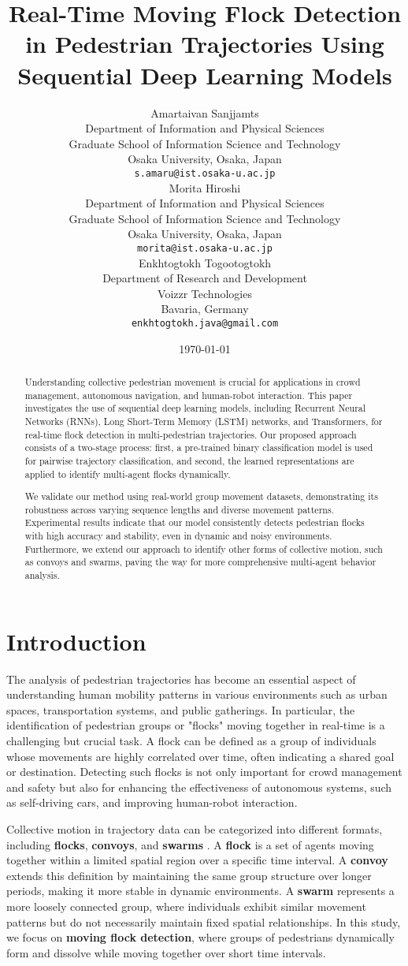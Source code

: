 \documentclass{article}
\title{Real-Time Moving Flock Detection in Pedestrian Trajectories Using Sequential Deep Learning Models}
\author{
Amartaivan Sanjjamts\\
Department of Information and Physical Sciences\\
Graduate School of Information Science and Technology\\
Osaka University, Osaka, Japan\\
\texttt{s.amaru@ist.osaka-u.ac.jp}\\
\And
Morita Hiroshi\\
Department of Information and Physical Sciences\\
Graduate School of Information Science and Technology\\
Osaka University, Osaka, Japan\\
\texttt{morita@ist.osaka-u.ac.jp}\\
\And
Enkhtogtokh Togootogtokh\\
Department of Research and Development\\
Voizzr Technologies\\
Bavaria, Germany\\
\texttt{enkhtogtokh.java@gmail.com}\\
}
\date{\today}
\begin{document}
\maketitle

\begin{abstract}
Understanding collective pedestrian movement is crucial for applications in crowd management, autonomous navigation, and human-robot interaction. This paper investigates the use of sequential deep learning models, including Recurrent Neural Networks (RNNs), Long Short-Term Memory (LSTM) networks, and Transformers, for real-time flock detection in multi-pedestrian trajectories. Our proposed approach consists of a two-stage process: first, a pre-trained binary classification model is used for pairwise trajectory classification, and second, the learned representations are applied to identify multi-agent flocks dynamically. 

We validate our method using real-world group movement datasets, demonstrating its robustness across varying sequence lengths and diverse movement patterns. Experimental results indicate that our model consistently detects pedestrian flocks with high accuracy and stability, even in dynamic and noisy environments. Furthermore, we extend our approach to identify other forms of collective motion, such as convoys and swarms, paving the way for more comprehensive multi-agent behavior analysis. 

\end{abstract}


\section{Introduction}

The analysis of pedestrian trajectories has become an essential aspect of understanding human mobility patterns in various environments such as urban spaces, transportation systems, and public gatherings. In particular, the identification of pedestrian groups or "flocks" moving together in real-time is a challenging but crucial task. A flock can be defined as a group of individuals whose movements are highly correlated over time, often indicating a shared goal or destination. Detecting such flocks is not only important for crowd management and safety but also for enhancing the effectiveness of autonomous systems, such as self-driving cars, and improving human-robot interaction.

Collective motion in trajectory data can be categorized into different formats, including \textbf{flocks}, \textbf{convoys}, and \textbf{swarms} \cite{wang2020big}. A \textbf{flock} is a set of agents moving together within a limited spatial region over a specific time interval. A \textbf{convoy} extends this definition by maintaining the same group structure over longer periods, making it more stable in dynamic environments. A \textbf{swarm} represents a more loosely connected group, where individuals exhibit similar movement patterns but do not necessarily maintain fixed spatial relationships. In this study, we focus on \textbf{moving flock detection}, where groups of pedestrians dynamically form and dissolve while moving together over short time intervals.
\end{document}
